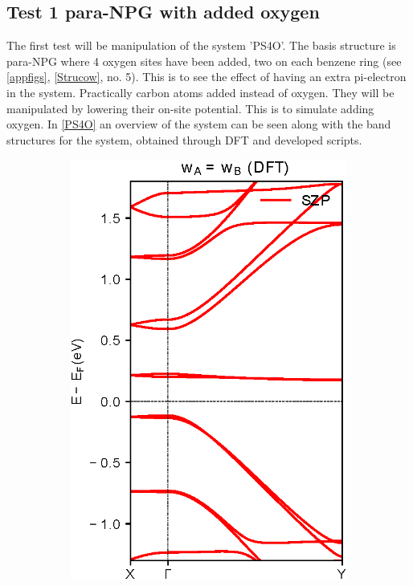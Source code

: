 \subsection{Test 1 para-NPG with added oxygen}
The first test will be manipulation of the system 'PS4O'. The basis structure is para-NPG where 4 oxygen sites have been added, two on each benzene ring (see \cref{appfigs}, \cref{Strucow}, no. 5). This is to see the effect of having an extra pi-electron in the system. Practically carbon atoms added instead of oxygen. They will be manipulated by lowering their on-site potential. This is to simulate adding oxygen. In \cref{PS4O} an overview of the system can be seen along with the band structures for the system, obtained through DFT and developed scripts. 
\begin{figure}[h]
    \centering
    \begin{subfigure}[b]{0.3\textwidth}
    \centering
    \includegraphics[width=\textwidth]{Figures/PS4ODFT.eps}

\end{subfigure}
\end{figure}
